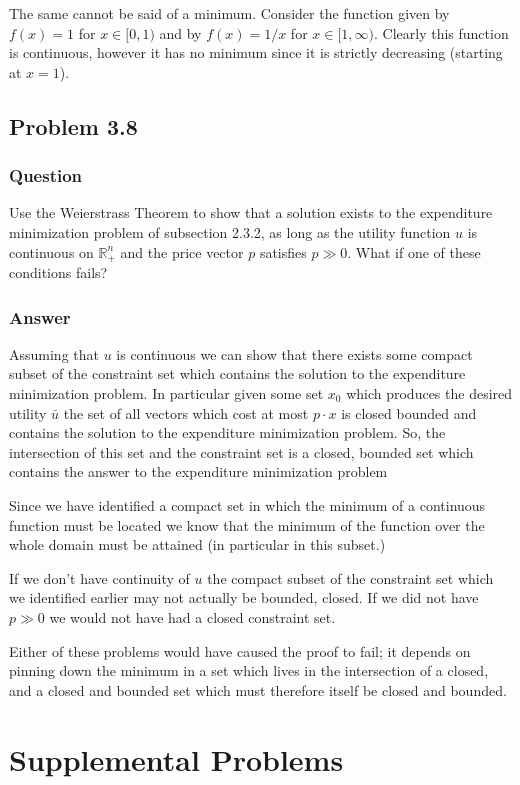 \documentclass[12pt]{article}
\begin{document}
The same cannot be said of a minimum. Consider the function given by $f(x)=1$ for $x \in [0,1)$ and by $f(x)=1/x$ for $x \in [1,\infty)$. Clearly this function is continuous, however it has no minimum since it is strictly decreasing (starting at $x=1$).
\subsection{Problem 3.8}
\subsubsection{Question}
Use the Weierstrass Theorem to show that a solution exists to the expenditure minimization problem of subsection 2.3.2, as long as the utility function $u$ is continuous on $\mathbb{R}_+^n$ and the price vector $p$ satisfies $p\gg0$. What if one of these conditions fails?
\subsubsection{Answer}
Assuming that $u$ is continuous we can show that there exists some compact subset of the constraint set which contains the solution to the expenditure minimization problem. In particular given some set $x_0$ which produces the desired utility $\bar{u}$ the set of all vectors which cost at most $p\cdot x$ is closed bounded and contains the solution to the expenditure minimization problem. So, the intersection of this set and the constraint set is a closed, bounded set which contains the answer to the expenditure minimization problem

Since we have identified a compact set in which the minimum of a continuous function must be located we know that the minimum of the function over the whole domain must be attained (in particular in this subset.)

If we don't have continuity of $u$ the compact subset of the constraint set which we identified earlier may not actually be bounded, closed. If we did not have $p \gg 0 $ we would not have had a closed constraint set. 

Either of these problems would have caused the proof to fail; it depends on pinning down the minimum in a set which lives in the intersection of a closed, and a closed and bounded set which must therefore itself be closed and bounded.


\section{Supplemental Problems}
\end{document}
